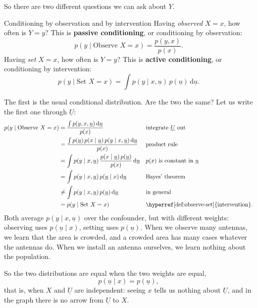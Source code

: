 \documentclass[a4paper,12pt,oneside]{report}
\begin{document}
So there are two different questions we can ask about $Y$.

\begin{frameddefn}{Conditioning by observation and by intervention}\label{def:observe-set}
Having \emph{observed} $X=x$, how often is $Y=y$? This is
\textbf{passive conditioning}, or conditioning by observation:
\[
p(y\mid\text{Observe }X=x)=\frac{p(y,x)}{p(x)} .
\]
Having \emph{set} $X=x$, how often is $Y=y$? This is \textbf{active
conditioning}, or conditioning by intervention:
\[
p(y\mid\text{Set }X=x)=\int p(y\mid x,\underline{u})\,p(\underline{u})\,\mathrm{d}\underline{u} .
\]
\end{frameddefn}

The first is the usual conditional distribution. Are the two the same?
Let us write the first one through $\underline{U}$:
\begin{align*}
p(y\mid\text{Observe }X=x)
&=\frac{\int p(y,x,\underline{u})\,\mathrm{d}\underline{u}}{p(x)}
&&\text{integrate $\underline{U}$ out}\\
&=\frac{\int p(\underline{u})\,p(x\mid\underline{u})\,p(y\mid x,\underline{u})\,\mathrm{d}\underline{u}}{p(x)}
&&\text{product rule}\\
&=\int p(y\mid x,\underline{u})\,\frac{p(x\mid\underline{u})\,p(\underline{u})}{p(x)}\,\mathrm{d}\underline{u}
&&\text{$p(x)$ is constant in $\underline{u}$}\\
&=\int p(y\mid x,\underline{u})\,p(\underline{u}\mid x)\,\mathrm{d}\underline{u}
&&\text{Bayes' theorem}\\
&\neq\int p(y\mid x,\underline{u})\,p(\underline{u})\,\mathrm{d}\underline{u}
&&\text{in general}\\
&=p(y\mid\text{Set }X=x)
&&\text{\hyperref[def:observe-set]{intervention}.}
\end{align*}
Both average $p(y\mid x,\underline{u})$ over the confounder, but with
different weights: observing uses $p(\underline{u}\mid x)$, setting uses
$p(\underline{u})$. When we observe many antennas, we learn that the area
is crowded, and a crowded area has many cases whatever the antennas do.
When we install an antenna ourselves, we learn nothing about the
population.

\label{note:observe-equals-set}%
So the two distributions are equal when the two weights are equal,
\[
p(\underline{u}\mid x)=p(\underline{u}),
\]
that is, when $X$ and $\underline{U}$ are independent: seeing $x$ tells us
nothing about $\underline{U}$, and in the graph there is no arrow from
$\underline{U}$ to $X$.
\end{document}
